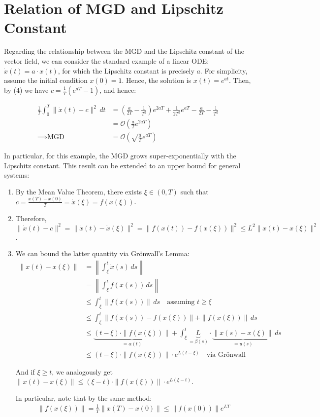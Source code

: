 \section{Relation of MGD and Lipschitz Constant}\label{app:lip}


Regarding the relationship between the MGD and the Lipschitz constant of the vector field, we can consider the standard example of a linear ODE: $\dot{x}(t) = a \cdot x(t)$, for which the Lipschitz constant is precisely $a$. For simplicity, assume the initial condition $x(0) = 1$. Hence, the solution is $x(t) = e^{at}$. Then, by (4) we have $c = \frac{1}{T}(e^{aT} - 1)$, and hence:

\[
\begin{aligned}
\frac{1}{T} \int_0^T \|\dot{x}(t) - c\|^2 \, dt
&= \left( \frac{a}{2T} - \frac{1}{T^2} \right)e^{2aT} + \frac{1}{2T^2} e^{aT} - \frac{a}{2T} - \frac{1}{T^2}
\\&= \mathcal{O}\left(\frac{a}{T} e^{2aT}\right)
\\ \implies \text{MGD} &= \mathcal{O}\left(\sqrt{\frac{a}{T}} e^{aT}\right)
\end{aligned}
\]

In particular, for this example, the MGD grows super-exponentially with the Lipschitz constant. This result can be extended to an upper bound for general systems:

\begin{enumerate}
    \item By the Mean Value Theorem, there exists $\xi \in (0, T)$ such that $c = \frac{x(T) - x(0)}{T} = \dot{x}(\xi) = f(x(\xi))$.
    \item Therefore, $\|\dot{x}(t) - c\|^2 = \|\dot{x}(t) - \dot{x}(\xi)\|^2 = \|f(x(t)) - f(x(\xi))\|^2 \leq L^2 \|x(t) - x(\xi)\|^2$.
    \item We can bound the latter quantity via Grönwall's Lemma:
    \[
    \begin{aligned}
    \|x(t) - x(\xi)\|
    &= \left\|\int_{\xi}^t \dot{x}(s) \, ds \right\|
    \\&= \left\|\int_{\xi}^t f(x(s)) \, ds \right\|
    \\&\leq \int_{\xi}^t \|f(x(s))\| \, ds \quad \text{assuming } t \geq \xi
    \\&\leq \int_{\xi}^t \|f(x(s)) - f(x(\xi))\| + \|f(x(\xi))\| \, ds
    \\&\leq \underbrace{(t - \xi) \cdot \|f(x(\xi))\|}_{=\alpha(t)} + \int_{\xi}^t \underbrace{L}_{=\beta(s)} \cdot \underbrace{\|x(s) - x(\xi)\|}_{=u(s)} \, ds
    \\&\leq (t - \xi) \cdot \|f(x(\xi))\| \cdot e^{L(t - \xi)} \quad \text{via Grönwall}
    \end{aligned}
    \]

    And if $\xi \geq t$, we analogously get $\|x(t) - x(\xi)\| \leq (\xi - t) \cdot \|f(x(\xi))\| \cdot e^{L(\xi - t)}$.

    In particular, note that by the same method:
    \[
    \begin{aligned}
    \|f(x(\xi))\| = \frac{1}{T} \|x(T) - x(0)\| \leq \|f(x(0))\| e^{LT}
    \end{aligned}
    \]
\end{enumerate}

